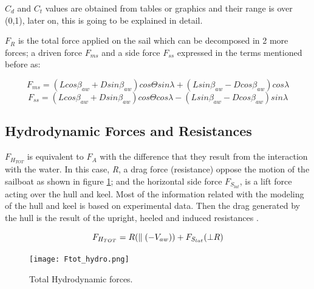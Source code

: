 $C_{d}$ and $C_{t}$ values are obtained from tables or graphics and their range is over (0,1), later on, this is going to be explained in detail. \par 
$F_{R}$ is the total force applied on the sail which can be decomposed in 2 more forces; a driven force $F_{ms}$ and a side force $F_{ss}$ expressed in the terms mentioned before as:\par
\begin{equation}\label{eq:drive_sail_force}
    F_{ms}= (L cos \beta_{aw}+ D sin \beta_{aw})cos \Theta sin \lambda + (L sin \beta_{aw}-D cos\beta_{aw})cos \lambda
\end{equation}
\begin{equation}\label{eq:side_sail_force}
    F_{ss}=(L cos \beta_{aw}+ D sin \beta_{aw})cos \Theta cos \lambda - (L sin \beta_{aw}-D cos\beta_{aw})sin \lambda
\end{equation}
\subsection {Hydrodynamic Forces and Resistances} \label{sec:hydroforces}
$F_{H_{TOT}}$ is equivalent to $F_{A}$ with the difference that they result from the interaction with the water. In this case, \textit{R}, a drag force (resistance) oppose the motion of the sailboat as shown in figure \ref{fig:Ftot_hydro}; and the horizontal side force $F_{S_{lat}}$, is a lift force acting over the hull and keel. Most of the information related with the modeling of the hull and keel is based on experimental data. %
Then the drag generated by the hull is the result of the  upright, heeled and induced resistances \cite{philpott1993yacht}.\par


\begin{equation}
    F_{H_{TOT}}=R(\parallel( -V_{aw})) + F_{S_{lat}}(\bot R )\\
\end{equation}

\begin{figure}
    \centering
    \texttt{[image: Ftot\_hydro.png]}
    \caption{Total Hydrodynamic forces. \cite{fossati2009aero}}
    \label{fig:Ftot_hydro}
\end{figure}

